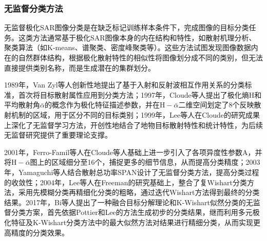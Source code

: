 \subsubsection{无监督分类方法}
无监督极化SAR图像分类是在缺乏标记训练样本条件下，完成图像的目标分类任务。这类方法通常基于极化SAR图像本身的内在结构和特性，如散射机理分析、聚类算法（如K-means、谱聚类、密度峰聚类等）。这些方法试图发现图像数据内在的自然群体结构，根据极化散射特性的相似性将图像划分成不同的类别，但无法直接提供类别名称，而是生成潜在的集群划分。

1989年，Van Zyl等人创新性地提出了基于入射和反射波相互作用关系的分类标准，首次将目标散射属性应用到分类方法；1997年，Cloude等人提出了极化熵$\mathrm{H}$和平均散射角$\bar{\alpha}$的概念作为极化特征描述参数，并在$\mathrm{H}-\bar{\alpha}$二维空间划定了8个反映散射机制的区域，用于区分不同的目标类别；1999年，Lee等人在Cloude的研究成果上深化了无监督学习方法，开创性地结合了地物目标散射特性和统计特性，为后续无监督研究提供了重要理论支撑。


2001年，Ferro-Famil等人在Cloude等人基础上进一步引入了各项异度性参数$\mathrm{A}$，并将$\mathrm{H}-\bar{\alpha}$图上的区域细分至16个，捕捉更多的细节信息，从而提高分类精度；2003年，Yamaguchi等人结合散射总功率SPAN设计了无监督分类方法，提高分类过程的收敛性；2004年，Lee等人在Freeman的研究基础上，整合了复Wishart分类方法，采用先模糊分类再精细化分类的粗略，通过迭代Wishart方法得到最终的分类结果。2017年，Bi等人提出了一种融合目标分解理论和K-Wishart似然分类的无监督分类方案，首先依据Pottier和Lee的方法生成初步的分类结果，继而利用多元极化特征及K-Wishart分类方法中的最大似然方法对结果进行精细分类，从而实现更高精度的分类效果。


